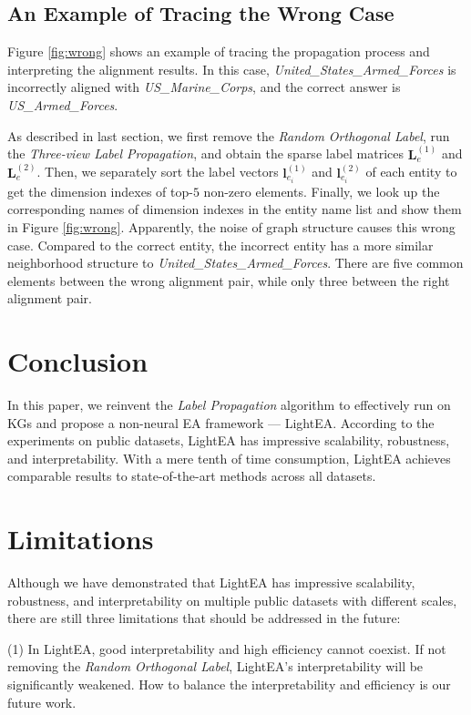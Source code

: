 \documentclass[11pt]{article}
\begin{document}
\subsection{An Example of Tracing the Wrong Case}
\label{sec:wrong_case}
Figure \ref{fig:wrong} shows an example of tracing the propagation process and interpreting the alignment results.
In this case, \emph{United\_States\_Armed\_Forces} is incorrectly aligned with \emph{US\_Marine\_Corps}, and the correct answer is \emph{US\_Armed\_Forces}.

As described in last section, we first remove the \emph{Random Orthogonal Label}, run the \emph{Three-view Label Propagation}, and obtain the sparse label matrices $\bm L^{(1)}_e$ and $\bm L^{(2)}_e$.
Then, we separately sort the label vectors $\bm l^{(1)}_{e_i}$ and $\bm l^{(2)}_{e_i}$ of each entity to get the dimension indexes of top-$5$ non-zero elements.
Finally, we look up the corresponding names of dimension indexes in the entity name list and show them in Figure \ref{fig:wrong}.
Apparently, the noise of graph structure causes this wrong case.
Compared to the correct entity, the incorrect entity has a more similar neighborhood structure to \emph{United\_States\_Armed\_Forces}.
There are five common elements between the wrong alignment pair, while only three between the right alignment pair.

\section{Conclusion}
In this paper, we reinvent the \emph{Label Propagation} algorithm to effectively run on KGs and propose a non-neural EA framework --- LightEA.
According to the experiments on public datasets, LightEA has impressive scalability, robustness, and interpretability.
With a mere tenth of time consumption, LightEA achieves comparable results to state-of-the-art methods across all datasets.

\section*{Limitations}
Although we have demonstrated that LightEA has impressive scalability, robustness, and interpretability on multiple public datasets with different scales, there are still three limitations that should be addressed in the future:

(1) In LightEA, good interpretability and high efficiency cannot coexist.
If not removing the \emph{Random Orthogonal Label}, LightEA's interpretability will be significantly weakened.
How to balance the interpretability and efficiency is our future work.
\end{document}
